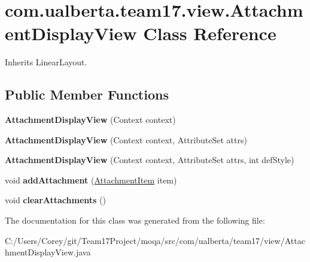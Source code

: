 \hypertarget{classcom_1_1ualberta_1_1team17_1_1view_1_1_attachment_display_view}{\section{com.\+ualberta.\+team17.\+view.\+Attachment\+Display\+View Class Reference}
\label{classcom_1_1ualberta_1_1team17_1_1view_1_1_attachment_display_view}
}


Inherits Linear\+Layout.

\subsection*{Public Member Functions}
\begin{DoxyCompactItemize}
\item 
\hypertarget{classcom_1_1ualberta_1_1team17_1_1view_1_1_attachment_display_view_a5f56fa6f36ff9f38a4c5e47639a25ba2}{{\bfseries Attachment\+Display\+View} (Context context)}\label{classcom_1_1ualberta_1_1team17_1_1view_1_1_attachment_display_view_a5f56fa6f36ff9f38a4c5e47639a25ba2}

\item 
\hypertarget{classcom_1_1ualberta_1_1team17_1_1view_1_1_attachment_display_view_abba157b5d8c601d64a227b989b5e0ce9}{{\bfseries Attachment\+Display\+View} (Context context, Attribute\+Set attrs)}\label{classcom_1_1ualberta_1_1team17_1_1view_1_1_attachment_display_view_abba157b5d8c601d64a227b989b5e0ce9}

\item 
\hypertarget{classcom_1_1ualberta_1_1team17_1_1view_1_1_attachment_display_view_a950d423c92d38914660fb28fb5fc3ac0}{{\bfseries Attachment\+Display\+View} (Context context, Attribute\+Set attrs, int def\+Style)}\label{classcom_1_1ualberta_1_1team17_1_1view_1_1_attachment_display_view_a950d423c92d38914660fb28fb5fc3ac0}

\item 
\hypertarget{classcom_1_1ualberta_1_1team17_1_1view_1_1_attachment_display_view_ae5887ed70eda30a6e1fc51934d963fd8}{void {\bfseries add\+Attachment} (\hyperlink{classcom_1_1ualberta_1_1team17_1_1_attachment_item}{Attachment\+Item} item)}\label{classcom_1_1ualberta_1_1team17_1_1view_1_1_attachment_display_view_ae5887ed70eda30a6e1fc51934d963fd8}

\item 
\hypertarget{classcom_1_1ualberta_1_1team17_1_1view_1_1_attachment_display_view_ac9f719b2692c52d28c7d987deb81ea0d}{void {\bfseries clear\+Attachments} ()}\label{classcom_1_1ualberta_1_1team17_1_1view_1_1_attachment_display_view_ac9f719b2692c52d28c7d987deb81ea0d}

\end{DoxyCompactItemize}


The documentation for this class was generated from the following file\+:\begin{DoxyCompactItemize}
\item 
C\+:/\+Users/\+Corey/git/\+Team17\+Project/moqa/src/com/ualberta/team17/view/Attachment\+Display\+View.\+java\end{DoxyCompactItemize}
